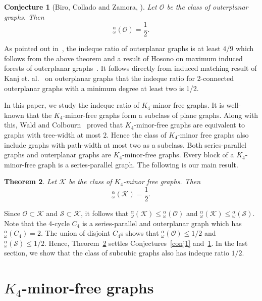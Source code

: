 \documentclass{article}
\newtheorem{thm}{Theorem}[section]
\newtheorem{conj}[thm]{Conjecture}
\newcommand{\idq}{{}^{\alpha}_{\omega}}
\begin{document}
\begin{conj}[Biro, Collado and Zamora, \cite{BCZ}]\label{conj2}
    Let $\mathcal O$ be the class of outerplanar graphs. Then
    \[\idq(\mathcal O)=\frac 1 2.\]
\end{conj}

As pointed out in~\cite{BCZ}, the indeque ratio of outerplanar graphs is at least $4/9$ which follows from the above theorem and a result of Hosono on maximum induced forests of outerplanar graphs~\cite{Ho}.  It follows directly from induced matching result of Kanj et. al.~\cite{KPSX} on outerplanar graphs that the indeque ratio for 2-connected outerplanar graphs with a minimum degree at least two is 1/2.


In this paper, we study the indeque ratio of $K_4$-minor free graphs. It is well-known that the $K_4$-minor-free graphs form a subclass of plane graphs. Along with this, Wald and Colbourn~\cite{WC} proved that $K_4$-minor-free graphs are equivalent to graphs with tree-width at most $2$. Hence the class of $K_4$-minor free graphs also include graphs with path-width at most two as a subclass. Both series-parallel graphs and outerplanar graphs are $K_4$-minor-free graphs. Every block of a $K_4$-minor-free graph is a series-parallel graph. The following is our main result.

\begin{thm}\label{thm:main}
Let $\mathcal K$ be the class of $K_4$-minor free graphs. Then
\[\idq(\mathcal K)=\frac 1 2 .\]
\end{thm}

Since $\mathcal O\subset \mathcal K$ and $\mathcal S\subset \mathcal K$, it follows that $\idq(\mathcal K)\le\idq(\mathcal O)$ and $\idq(\mathcal K)\le \idq(\mathcal S)$. Note that the $4$-cycle $C_4$ is a series-parallel and outerplanar graph which has $\idq(C_4)=2$. The union of disjoint $C_4$s shows that $\idq(\mathcal O)\le 1/2$ and $\idq(\mathcal S)\le 1/2$. Hence, Theorem~\ref{thm:main} settles Conjectures~\ref{conj1} and~\ref{conj2}. %
In the last section, we show that the class of subcubic graphs also has indeque ratio $1/2$. 


\section{$K_4$-minor-free graphs}
\end{document}
